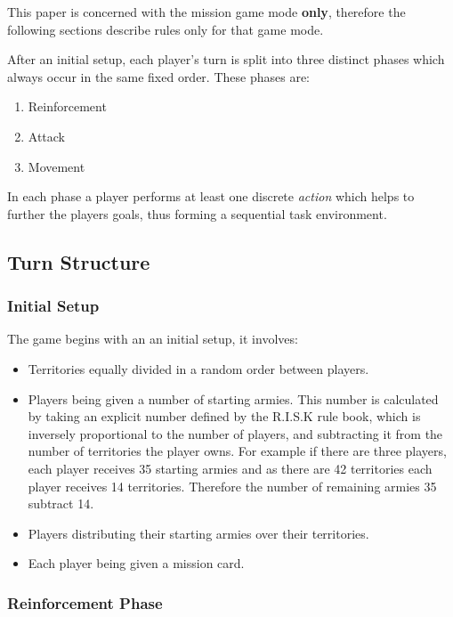 \documentclass[parskip]{cs4rep}
\begin{document}
This paper is concerned with the mission game mode \textbf{only}, therefore the following sections describe rules only for that game mode.

After an initial setup, each player's turn is split into three distinct phases which always occur in the same fixed order. These phases are:

\begin{enumerate}
\item
Reinforcement
\item
Attack
\item
Movement
\newline
\end{enumerate}

In each phase a player performs at least one discrete \textit{action} which helps to further the players goals, thus forming a sequential task environment.

\subsection{Turn Structure}

\subsubsection{Initial Setup}

The game begins with an an initial setup, it involves:

\begin{itemize}
\item
Territories equally divided in a random order between players.
\item
Players being given a number of starting armies. This number is calculated by taking an explicit number defined by the R.I.S.K rule book, which is inversely proportional to the number of players, and subtracting it from the number of territories the player owns. For example if there are three players, each player receives 35 starting armies and as there are 42 territories each player receives 14 territories. Therefore the number of remaining armies 35 subtract 14.
\item
Players distributing their starting armies over their territories.
\item
Each player being given a mission card.
\end{itemize}

\subsubsection{Reinforcement Phase}
\end{document}
